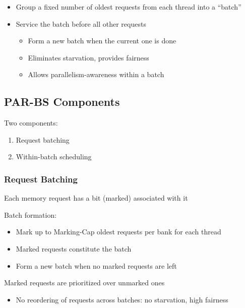 \documentclass[]{article}
\providecommand{\tightlist}{%
  \setlength{\itemsep}{0pt}\setlength{\parskip}{0pt}}
\begin{document}
\begin{itemize}
\tightlist
\item
  Group a fixed number of oldest requests from each thread into a
  ``batch''
\item
  Service the batch before all other requests

  \begin{itemize}
  \tightlist
  \item
    Form a new batch when the current one is done
  \item
    Eliminates starvation, provides fairness
  \item
    Allows parallelism-awareness within a batch
  \end{itemize}
\end{itemize}

\hypertarget{par-bs-components}{%
\subsection{PAR-BS Components}\label{par-bs-components}}

Two components:

\begin{enumerate}
\def\labelenumi{\arabic{enumi}.}
\tightlist
\item
  Request batching
\item
  Within-batch scheduling
\end{enumerate}

\hypertarget{request-batching}{%
\subsubsection{Request Batching}\label{request-batching}}

Each memory request has a bit (marked) associated with it

Batch formation:

\begin{itemize}
\tightlist
\item
  Mark up to Marking-Cap oldest requests per bank for each thread
\item
  Marked requests constitute the batch
\item
  Form a new batch when no marked requests are left
\end{itemize}

Marked requests are prioritized over unmarked ones

\begin{itemize}
\tightlist
\item
  No reordering of requests across batches: no starvation, high fairness
\end{itemize}
\end{document}
